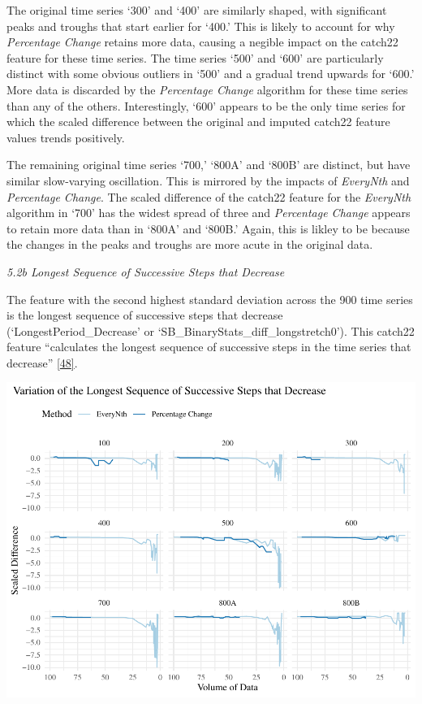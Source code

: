 \documentclass{article}
\begin{document}
The original time series `300' and `400' are similarly shaped, with
significant peaks and troughs that start earlier for `400.' This is
likely to account for why \emph{Percentage Change} retains more data,
causing a negible impact on the catch22 feature for these time series.
The time series `500' and `600' are particularly distinct with some
obvious outliers in `500' and a gradual trend upwards for `600.' More
data is discarded by the \emph{Percentage Change} algorithm for these
time series than any of the others. Interestingly, `600' appears to be
the only time series for which the scaled difference between the
original and imputed catch22 feature values trends positively.

The remaining original time series `700,' `800A' and `800B' are
distinct, but have similar slow-varying oscillation. This is mirrored by
the impacts of \emph{EveryNth} and \emph{Percentage Change}. The scaled
difference of the catch22 feature for the \emph{EveryNth} algorithm in
`700' has the widest spread of three and \emph{Percentage Change}
appears to retain more data than in `800A' and `800B.' Again, this is
likley to be because the changes in the peaks and troughs are more acute
in the original data.

\emph{5.2b Longest Sequence of Successive Steps that Decrease}

The feature with the second highest standard deviation across the 900
time series is the longest sequence of successive steps that decrease
(`LongestPeriod\_Decrease' or `SB\_BinaryStats\_diff\_longstretch0').
This catch22 feature ``calculates the longest sequence of successive
steps in the time series that decrease''
\protect\hyperlink{ref-feature_book}{{[}48{]}}.

\includegraphics{210431461_CSC8639_Dissertation_files/figure-latex/LongestDecrease-1.pdf}
\end{document}
